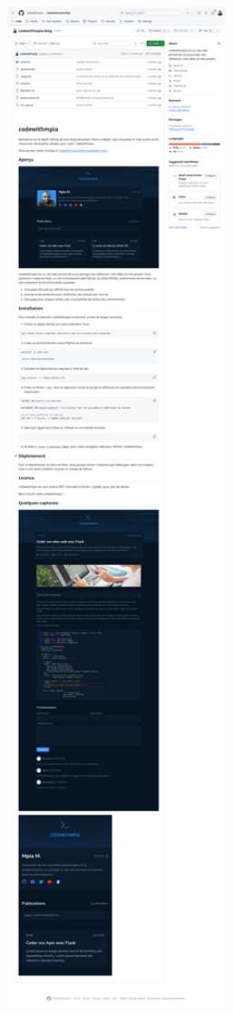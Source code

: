 \documentclass[a4paper,11pt]{article}
\begin{document}
        \includegraphics[width=0.8\textwidth]{PUBLICATION/screen1.png}\\
\end{document}
